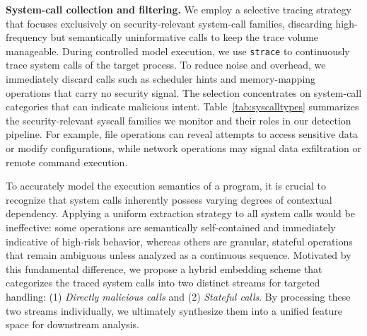 \noindent \textbf{System-call collection and filtering.} %
We employ a selective tracing strategy that focuses exclusively on security-relevant system-call families, discarding high-frequency but semantically uninformative calls to keep the trace volume manageable. During controlled model execution, we use \texttt{strace} to continuously trace system calls of the target process. To reduce noise and overhead, we immediately discard calls such as scheduler hints and memory-mapping operations that carry no security signal\cite{shakya2022analysisdetectionclassificationandroid}. The selection concentrates on system-call categories that can indicate malicious intent. Table~\ref{tab:syscalltypes} summarizes the security-relevant syscall families we monitor and their roles in our detection pipeline. For example, file operations can reveal attempts to access sensitive data or modify configurations, while network operations may signal data exfiltration or remote command execution.

To accurately model the execution semantics of a program, it is crucial to recognize that system calls inherently possess varying degrees of contextual dependency. Applying a uniform extraction strategy to all system calls would be ineffective: some operations are semantically self-contained and immediately indicative of high-risk behavior, whereas others are granular, stateful operations that remain ambiguous unless analyzed as a continuous sequence. Motivated by this fundamental difference, we propose a hybrid embedding scheme that categorizes the traced system calls into two distinct streams for targeted handling: (1) \emph{Directly malicious calls} and (2) \emph{Stateful calls}. By processing these two streams individually, we ultimately synthesize them into a unified feature space for downstream analysis.

